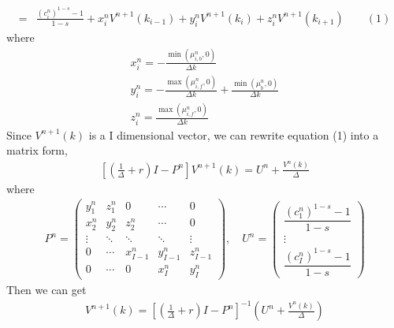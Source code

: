 \documentclass{article}
\begin{document}
\begin{CJK}{UTF8}{min}
\begin{align*}
=&\frac{(c_i^n)^{1-s}-1}{1-s}+x_i^nV^{n+1}(k_{i-1})+y_i^nV^{n+1}(k_i)+z_i^nV^{n+1}(k_{i+1})\qquad(1)
\end{align*}
where
\begin{align*}
x_i^n=-\frac{\min(\mu_{i,b}^n,0)}{\Delta k}\\
y_i^n=-\frac{\max(\mu_{i,f}^n,0)}{\Delta k}+\frac{\min(\mu_b^n,0)}{\Delta k}\\
z_i^n=\frac{\max(\mu_{i,f}^n,0)}{\Delta k}
\end{align*}
Since $V^{n+1}(k)$ is a I dimensional vector, we can rewrite equation (1) into a matrix form,
\begin{align*}
\left[\left(\frac{1}{\Delta } +r\right)I-P^n\right]V^{n+1}(k)=U^n+\frac{V^n(k)}{\Delta }
\end{align*}
where
\begin{align*}
P^n=\begin{pmatrix}y_1^n&z_1^n&0&\cdots&0\\x_2^n&y_2^n&z_2^n&\cdots&0\\\vdots&\ddots&\ddots&\ddots&\vdots\\0&\cdots&x^n_{I-1}&y^n_{I-1}&z^n_{I-1}\\0&\cdots&0&x^n_I&y^n_I
\end{pmatrix},\quad
U^n=\begin{pmatrix}
\dfrac{(c_1^n)^{1-s}-1}{1-s}\\\vdots\\\dfrac{(c_I^n)^{1-s}-1}{1-s}
\end{pmatrix}
\end{align*}
Then we can get 
\begin{align*}
V^{n+1}(k)=\left[\left(\frac{1}{\Delta } +r\right)I-P^n\right]^{-1}\left(U^n+\frac{V^n(k)}{\Delta }\right)
\end{align*}

\end{CJK}
\end{document}
